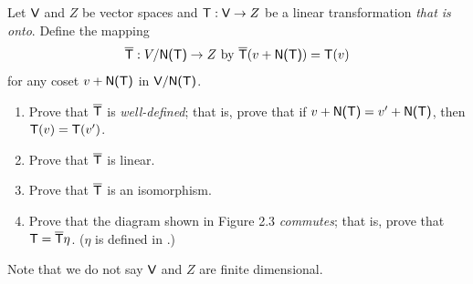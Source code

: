 \begin{exercise} \label{exercise 2.4.24}
Let \(\textsf{V}\) and \(Z\) be vector spaces and \(\textsf{T} : \textsf{V} \to Z\) be a linear transformation \emph{that is onto}.
Define the mapping
\[
    \overline{\textsf{T}} : V / \textsf{N(T)} \to Z \text{ by } \overline{\textsf{T}}(v + \textsf{N(T)}) = \textsf{T}(v)
\]
for any coset \(v + \textsf{N(T)}\) in \(\textsf{V} / \textsf{N(T)}\).
\begin{enumerate}
\item Prove that \(\overline{\textsf{T}}\) is \emph{well-defined};
    that is, prove that if \(v + \textsf{N(T)} = v' + \textsf{N(T)}\), then \(\textsf{T}(v) = \textsf{T}(v')\).
\item Prove that \(\overline{\textsf{T}}\) is linear.
\item Prove that \(\overline{\textsf{T}}\) is an isomorphism.
\item Prove that the diagram shown in Figure 2.3 \emph{commutes};
    that is, prove that \(\textsf{T} = \overline{\textsf{T}} \eta\). (\(\eta\) is defined in .)
\end{enumerate}

Note that we do not say \(\textsf{V}\) and \(Z\) are finite dimensional.
\end{exercise}

